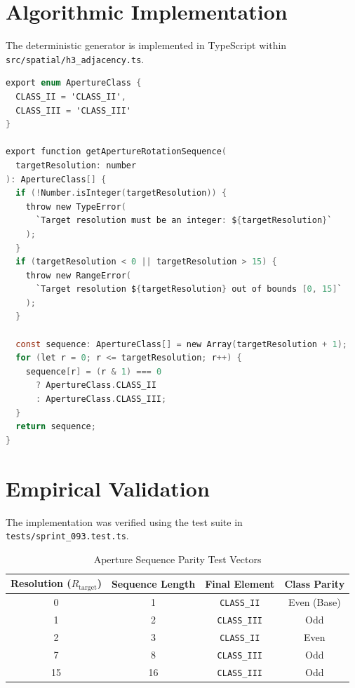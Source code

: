 \documentclass[10pt,journal,compsoc]{IEEEtran}
\begin{document}
\section{Algorithmic Implementation}

The deterministic generator is implemented in TypeScript within \texttt{src/spatial/h3\_adjacency.ts}.

\begin{lstlisting}[language=C]
export enum ApertureClass {
  CLASS_II = 'CLASS_II',
  CLASS_III = 'CLASS_III'
}

export function getApertureRotationSequence(
  targetResolution: number
): ApertureClass[] {
  if (!Number.isInteger(targetResolution)) {
    throw new TypeError(
      `Target resolution must be an integer: ${targetResolution}`
    );
  }
  if (targetResolution < 0 || targetResolution > 15) {
    throw new RangeError(
      `Target resolution ${targetResolution} out of bounds [0, 15]`
    );
  }

  const sequence: ApertureClass[] = new Array(targetResolution + 1);
  for (let r = 0; r <= targetResolution; r++) {
    sequence[r] = (r & 1) === 0 
      ? ApertureClass.CLASS_II 
      : ApertureClass.CLASS_III;
  }
  return sequence;
}
\end{lstlisting}

\section{Empirical Validation}
The implementation was verified using the test suite in \texttt{tests/sprint\_093.test.ts}.

\begin{table}[h]
\caption{Aperture Sequence Parity Test Vectors}
\label{tab:parity_vectors}
\centering
\begin{tabular}{@{}cccc@{}}
\toprule
Resolution ($R_{\text{target}}$) & Sequence Length & Final Element & Class Parity \\ \midrule
0 & 1 & \texttt{CLASS\_II} & Even (Base) \\
1 & 2 & \texttt{CLASS\_III} & Odd \\
2 & 3 & \texttt{CLASS\_II} & Even \\
7 & 8 & \texttt{CLASS\_III} & Odd \\
15 & 16 & \texttt{CLASS\_III} & Odd \\ \bottomrule
\end{tabular}
\end{table}
\end{document}

